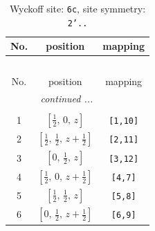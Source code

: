 \documentclass[fleqn,8pt]{jsarticle}
\begin{document}
\renewcommand{\arraystretch}{1.2}
\begin{longtable}{ccc}
\caption{Wyckoff site: {\tt 6c}, site symmetry: {\tt 2'..}}
 \\
 \hline \hline
No. & position & mapping \\ \hline \endfirsthead

\multicolumn{2}{l}{\tablename\ \thetable{}} \\
 \hline \hline
No. & position & mapping \\ \hline \endhead

 \hline \hline
\multicolumn{2}{r}{\footnotesize\it continued ...} \\ \endfoot

 \hline \hline
\multicolumn{2}{r}{} \\ \endlastfoot

1 & $\left[ \frac{1}{2},\, 0,\, z \right]$ & {\tt [1,10]} \\ \hline
2 & $\left[ \frac{1}{2},\, \frac{1}{2},\, z + \frac{1}{2} \right]$ & {\tt [2,11]} \\ \hline
3 & $\left[ 0,\, \frac{1}{2},\, z \right]$ & {\tt [3,12]} \\ \hline
4 & $\left[ \frac{1}{2},\, 0,\, z + \frac{1}{2} \right]$ & {\tt [4,7]} \\ \hline
5 & $\left[ \frac{1}{2},\, \frac{1}{2},\, z \right]$ & {\tt [5,8]} \\ \hline
6 & $\left[ 0,\, \frac{1}{2},\, z + \frac{1}{2} \right]$ & {\tt [6,9]} \\
\end{longtable}
\renewcommand{\arraystretch}{1.2}
\end{document}
